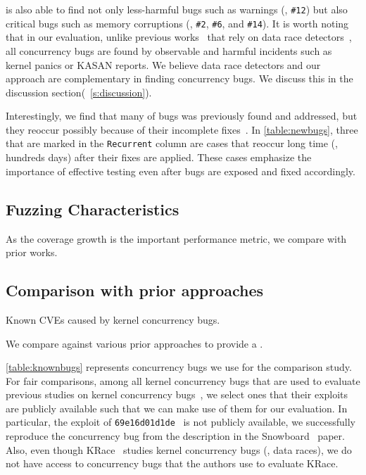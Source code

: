 \sys is also able to find not only less-harmful bugs such as warnings
(\eg, \texttt{\#12}) but also critical bugs such as memory corruptions
(\eg, \texttt{\#2}, \texttt{\#6}, and \texttt{\#14}).
%
It is worth noting that in our evaluation, unlike previous
works~\cite{snowboard, krace} that rely on data race
detectors~\cite{kcsan, tsan}, all concurrency bugs are found by
observable and harmful incidents such as kernel panics or KASAN
reports.
%
We believe data race detectors and our approach are complementary in
finding concurrency bugs. We discuss this in the discussion
section(~\autoref{s:discussion}).

Interestingly, we find that many of bugs was previously found and
addressed, but they reoccur possibly because of their incomplete
fixes~\cite{learningfrommistakes}.
%
In \autoref{table:newbugs}, three that are marked in the
\texttt{Recurrent} column are cases that reoccur long time (\eg,
hundreds days) after their fixes are applied.
%
These cases emphasize the importance of effective testing even after
bugs are exposed and fixed accordingly.






\subsection{Fuzzing Characteristics}
\label{ss:characteristics}

As the coverage growth is the important performance metric, we compare
\sys with prior works.




\subsection{Comparison with prior approaches}
\label{ss:comparison}

\begin{table}[t]
  
  \centering
  \caption{Known CVEs caused by kernel concurrency bugs.}
  \label{table:knownbugs}
\end{table}

We compare \sys against various prior approaches to provide a .

%
\autoref{table:knownbugs} represents concurrency bugs we use for the
comparison study.
%
For fair comparisons, among all kernel concurrency bugs that are used
to evaluate previous studies on kernel concurrency bugs~\cite{exprace,
  razzer, snowboard, krace}, we select ones that their exploits are
publicly available such that we can make use of them for our evaluation.
%
In particular, the exploit of
\texttt{69e16d01d1de}~\cite{snowboardbug} is not publicly available,
we successfully reproduce the concurrency bug from the description in
the Snowboard~\cite{snowboard} paper.
%
Also, even though KRace~\cite{krace} studies kernel concurrency bugs
(\ie, data races), we do not have access to concurrency bugs that the
authors use to evaluate KRace.

%







